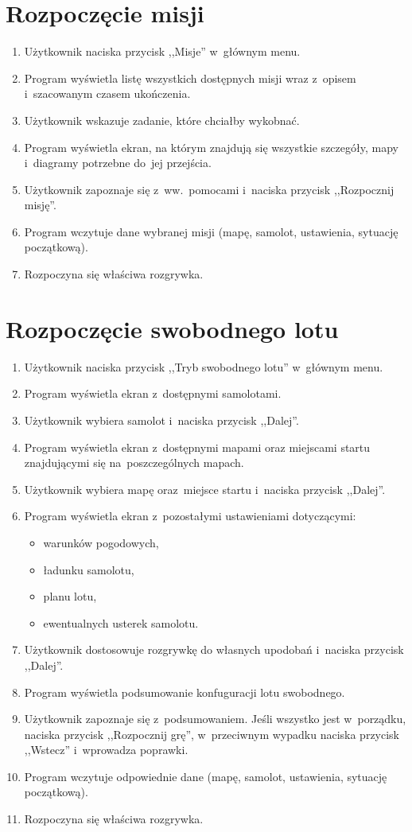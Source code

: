 \documentclass{mwrep}
\begin{document}
\section{Rozpoczęcie misji}
\begin{enumerate}
  \item Użytkownik naciska przycisk ,,Misje'' w~głównym menu.
  \item Program wyświetla listę wszystkich dostępnych misji wraz z~opisem i~szacowanym czasem ukończenia.
  \item Użytkownik wskazuje zadanie, które chciałby wykobnać.
  \item Program wyświetla ekran, na którym znajdują się wszystkie szczegóły, mapy i~diagramy potrzebne do~jej przejścia.
  \item Użytkownik zapoznaje się z~ww.~pomocami i~naciska przycisk ,,Rozpocznij misję''.
  \item Program wczytuje dane wybranej misji (mapę, samolot, ustawienia, sytuację początkową).
  \item Rozpoczyna się właściwa rozgrywka.
\end{enumerate}

\section{Rozpoczęcie swobodnego lotu}
\begin{enumerate}
  \item Użytkownik naciska przycisk ,,Tryb swobodnego lotu'' w~głównym menu.
  \item Program wyświetla ekran z~dostępnymi samolotami.
  \item Użytkownik wybiera samolot i~naciska przycisk ,,Dalej''.
  \item Program wyświetla ekran z~dostępnymi mapami oraz miejscami startu znajdującymi się na~poszczególnych mapach.
  \item Użytkownik wybiera mapę oraz~miejsce startu i~naciska przycisk ,,Dalej''.
  \item Program wyświetla ekran z~pozostałymi ustawieniami dotyczącymi:
  \begin{itemize}
    \item warunków pogodowych,
    \item ładunku samolotu,
    \item planu lotu,
    \item ewentualnych usterek samolotu.
  \end{itemize}
  \item Użytkownik dostosowuje rozgrywkę do własnych upodobań i~naciska przycisk ,,Dalej''.
  \item Program wyświetla podsumowanie konfuguracji lotu swobodnego.
  \item Użytkownik zapoznaje się z~podsumowaniem. Jeśli wszystko jest w~porządku, naciska przycisk ,,Rozpocznij grę'', w~przeciwnym wypadku naciska przycisk ,,Wstecz'' i~wprowadza poprawki.
  \item Program wczytuje odpowiednie dane (mapę, samolot, ustawienia, sytuację początkową).
  \item Rozpoczyna się właściwa rozgrywka.
\end{enumerate}
\end{document}
